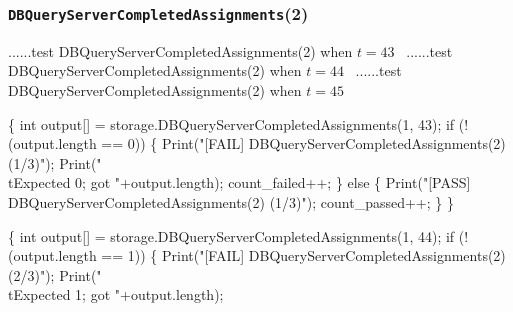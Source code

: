 \documentclass{article}
\def\nwendcode{\endtrivlist \endgroup}
\let\nwdocspar=\par
\begin{document}
\subsubsection{{\tt{}DBQueryServerCompletedAssignments}(2)}
\nwenddocs{}\endmoddef{}
  \LA{}......test \code{}DBQueryServerCompletedAssignments\edoc{}(2) when $t=43$~{\nwtagstyle{}}\RA{}
  \LA{}......test \code{}DBQueryServerCompletedAssignments\edoc{}(2) when $t=44$~{\nwtagstyle{}}\RA{}
  \LA{}......test \code{}DBQueryServerCompletedAssignments\edoc{}(2) when $t=45$~{\nwtagstyle{}}\RA{}
\nwendcode{}\nwdocspar
\nwenddocs{}\endmoddef{}
\{
  int output[] = storage.DBQueryServerCompletedAssignments(1, 43);
  if (!(output.length == 0)) \{
    Print("[FAIL] DBQueryServerCompletedAssignments(2) (1/3)");
    Print("\\tExpected 0; got "+output.length);
    count_failed++;
  \} else \{
    Print("[PASS] DBQueryServerCompletedAssignments(2) (1/3)");
    count_passed++;
  \}
\}
\nwendcode{}\nwdocspar
\nwenddocs{}\endmoddef{}
\{
  int output[] = storage.DBQueryServerCompletedAssignments(1, 44);
  if (!(output.length == 1)) \{
    Print("[FAIL] DBQueryServerCompletedAssignments(2) (2/3)");
    Print("\\tExpected 1; got "+output.length);
\end{document}
